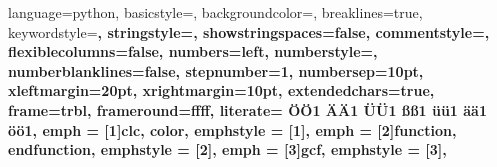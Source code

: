 {
  language=python,	%
  basicstyle=\scriptsize\ttfamily,	%
  backgroundcolor=\color{white},		%
  breaklines=true,	%
  keywordstyle=\bfseries\ttfamily\color{blue},	%
  stringstyle=\ttfamily\color{ees_yellow},			%
  showstringspaces=false,	%
  commentstyle=\color{ees_green}\ttfamily,	%
  flexiblecolumns=false,	%
  numbers=left,		%
  numberstyle=\tiny,	%
  numberblanklines=false,		%
  stepnumber=1,		%
  numbersep=10pt,		%
  xleftmargin=20pt,	%
  xrightmargin=10pt,	%
  extendedchars=true,	%
  frame=trbl,			%
  frameround=ffff,	%
  literate=		%
   {Ö}{{\"O}}1 
   {Ä}{{\"A}}1 
   {Ü}{{\"U}}1 
   {ß}{{\ss}}1 
   {ü}{{\"u}}1 
   {ä}{{\"a}}1 
   {ö}{{\"o}}1,
  emph = [1]{clc, color},
  emphstyle = [1]{\color{blue}},
  emph = [2]{function, endfunction},
  emphstyle = [2]{\color{ees_red}},
  emph = [3]{gcf},
  emphstyle = [3]{\color{black}},
}